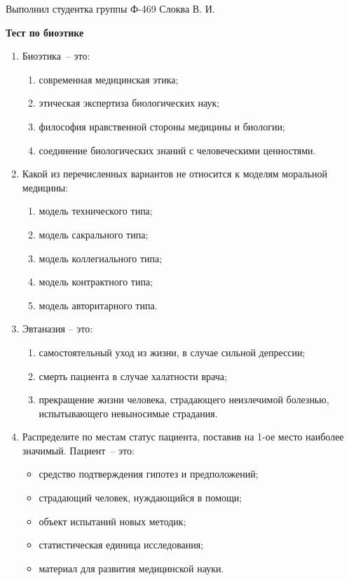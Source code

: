 \documentclass[12pt,pscyr]{hedwork}
\renewcommand{\labelenumii}{\asbuk{enumii})}
\newcommand{\itempo}{\stepcounter{enumii}\item[\bfseries\labelenumii]}
\begin{document}
  
  \begin{flushright}
    Выполнил студентка группы Ф-469 Слоква В. И.
  \end{flushright}
  \vspace{-2em}
  \begin{center}
    \bfseries Тест по биоэтике
  \end{center}

  \begin{enumerate}
    \item Биоэтика~-- это:
      \begin{enumerate}
        \item современная медицинская этика;
        \item этическая экспертиза биологических наук;
        \itempo философия нравственной стороны медицины и биологии;
        \item соединение биологических знаний с человеческими ценностями.
      \end{enumerate}
      
    \item Какой из перечисленных вариантов не относится к моделям моральной медицины:
      \begin{enumerate}
        \item модель технического типа;
        \item модель сакрального типа;
        \item модель коллегиального типа;
        \item модель контрактного типа;
        \itempo модель авторитарного типа.
      \end{enumerate}

    \item Эвтаназия -- это:
      \begin{enumerate}
        \item самостоятельный уход из жизни, в случае сильной депрессии;
        \item смерть пациента в случае халатности врача;
        \itempo прекращение жизни человека, страдающего неизлечимой болезнью,
          испытывающего невыносимые страдания.
      \end{enumerate} 

    \item Распределите по местам статус пациента, поставив на 1-ое место
      наиболее значимый. Пациент~-- это:
      \begin{itemize}
        \item средство подтверждения гипотез и предположений;
        \item страдающий человек, нуждающийся в помощи;
        \item объект испытаний новых методик;
        \item статистическая единица исследования;
        \item материал для развития медицинской науки.
      \end{itemize}


\end{enumerate}
\end{document}
